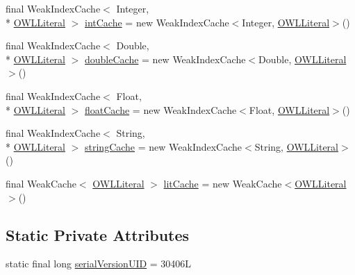 \begin{DoxyCompactItemize}
\item 
final Weak\-Index\-Cache$<$ Integer, \\*
\hyperlink{interfaceorg_1_1semanticweb_1_1owlapi_1_1model_1_1_o_w_l_literal}{O\-W\-L\-Literal} $>$ \hyperlink{classuk_1_1ac_1_1manchester_1_1cs_1_1owl_1_1owlapi_1_1_o_w_l_data_factory_internals_impl_a185eb87b7449a9c11f381f6c9253a0b0}{int\-Cache} = new Weak\-Index\-Cache$<$Integer, \hyperlink{interfaceorg_1_1semanticweb_1_1owlapi_1_1model_1_1_o_w_l_literal}{O\-W\-L\-Literal}$>$()
\item 
final Weak\-Index\-Cache$<$ Double, \\*
\hyperlink{interfaceorg_1_1semanticweb_1_1owlapi_1_1model_1_1_o_w_l_literal}{O\-W\-L\-Literal} $>$ \hyperlink{classuk_1_1ac_1_1manchester_1_1cs_1_1owl_1_1owlapi_1_1_o_w_l_data_factory_internals_impl_a8dc25e7e1aad5a8657743f663e27dc18}{double\-Cache} = new Weak\-Index\-Cache$<$Double, \hyperlink{interfaceorg_1_1semanticweb_1_1owlapi_1_1model_1_1_o_w_l_literal}{O\-W\-L\-Literal}$>$()
\item 
final Weak\-Index\-Cache$<$ Float, \\*
\hyperlink{interfaceorg_1_1semanticweb_1_1owlapi_1_1model_1_1_o_w_l_literal}{O\-W\-L\-Literal} $>$ \hyperlink{classuk_1_1ac_1_1manchester_1_1cs_1_1owl_1_1owlapi_1_1_o_w_l_data_factory_internals_impl_ac174eb1cd421196f1faf201ea2fe39b1}{float\-Cache} = new Weak\-Index\-Cache$<$Float, \hyperlink{interfaceorg_1_1semanticweb_1_1owlapi_1_1model_1_1_o_w_l_literal}{O\-W\-L\-Literal}$>$()
\item 
final Weak\-Index\-Cache$<$ String, \\*
\hyperlink{interfaceorg_1_1semanticweb_1_1owlapi_1_1model_1_1_o_w_l_literal}{O\-W\-L\-Literal} $>$ \hyperlink{classuk_1_1ac_1_1manchester_1_1cs_1_1owl_1_1owlapi_1_1_o_w_l_data_factory_internals_impl_ad642a9c01bc90de5ba8be39b6a6cb94e}{string\-Cache} = new Weak\-Index\-Cache$<$String, \hyperlink{interfaceorg_1_1semanticweb_1_1owlapi_1_1model_1_1_o_w_l_literal}{O\-W\-L\-Literal}$>$()
\item 
final Weak\-Cache$<$ \hyperlink{interfaceorg_1_1semanticweb_1_1owlapi_1_1model_1_1_o_w_l_literal}{O\-W\-L\-Literal} $>$ \hyperlink{classuk_1_1ac_1_1manchester_1_1cs_1_1owl_1_1owlapi_1_1_o_w_l_data_factory_internals_impl_a36629e67f251a34f4f2bb178c18ecd63}{lit\-Cache} = new Weak\-Cache$<$\hyperlink{interfaceorg_1_1semanticweb_1_1owlapi_1_1model_1_1_o_w_l_literal}{O\-W\-L\-Literal}$>$()
\end{DoxyCompactItemize}
\subsection*{Static Private Attributes}
\begin{DoxyCompactItemize}
\item 
static final long \hyperlink{classuk_1_1ac_1_1manchester_1_1cs_1_1owl_1_1owlapi_1_1_o_w_l_data_factory_internals_impl_af8d665c4beca0d7769b01e481fe43d4b}{serial\-Version\-U\-I\-D} = 30406\-L
\end{DoxyCompactItemize}

